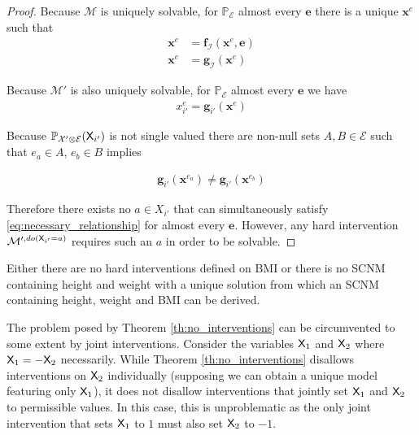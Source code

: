 \begin{proof}
Because $\mathcal{M}$ is uniquely solvable, for $\mathbb{P}_{\mathcal{E}}$ almost every $\mathbf{e}$ there is a unique $\mathbf{x}^e$ such that
\begin{align}
	\mathbf{x}^e &= \mathbf{f}_{\mathcal{I}}(\mathbf{x}^e,\mathbf{e})\\
	\mathbf{x}^e &= \mathbf{g}_{\mathcal{I}}(\mathbf{x}^e)
\end{align}

Because $\mathcal{M}'$ is also uniquely solvable, for $\mathbb{P}_{\mathcal{E}}$ almost every $\mathbf{e}$ we have
\begin{align}
	x^e_{i'} = \mathbf{g}_{i'}(\mathbf{x}^e) \label{eq:necessary_relationship}
\end{align}

Because $\mathbb{P}_{\mathcal{X}'\otimes\mathcal{E}}(\mathsf{X}_{i'})$ is not single valued there are non-null sets $A,B\in \mathcal{E}$ such that $e_a\in A$, $e_b\in B$ implies

\begin{align}
	\mathbf{g}_{i'}(\mathbf{x}^{e_a}) \neq \mathbf{g}_{i'}(\mathbf{x}^{e_b})
\end{align}

Therefore there exists no $a\in X_{i'}$ that can simultaneously satisfy \ref{eq:necessary_relationship} for almost every $\mathbf{e}$. However, any hard intervention $\mathcal{M}^{\prime,do(\mathsf{X}_{i'}=a)}$ requires such an $a$ in order to be solvable.
\end{proof}

\begin{corollary}
Either there are no hard interventions defined on BMI or there is no SCNM containing height and weight with a unique solution from which an SCNM containing height, weight and BMI can be derived.
\end{corollary}


The problem posed by Theorem \ref{th:no_interventions} can be circumvented to some extent by joint interventions. Consider the variables $\mathsf{X}_1$ and $\mathsf{X}_2$ where $\mathsf{X}_1 = - \mathsf{X}_2$ necessarily. While Theorem \ref{th:no_interventions} disallows interventions on $\mathsf{X}_2$ individually (supposing we can obtain a unique model featuring only $\mathsf{X}_1$), it does not disallow interventions that jointly set $\mathsf{X}_1$ and $\mathsf{X}_2$ to permissible values. In this case, this is unproblematic as the only joint intervention that sets $\mathsf{X}_1$ to $1$ must also set $\mathsf{X}_2$ to $-1$.


